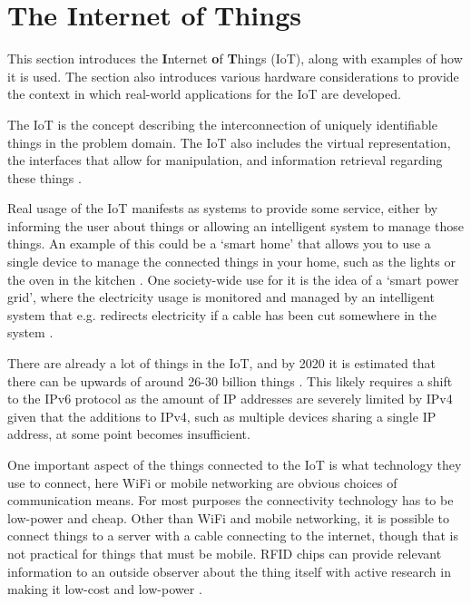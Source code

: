\section{The Internet of Things}
This section introduces the \textbf{I}nternet \textbf{o}f \textbf{T}hings (IoT), along with examples of how it is used. 
The section also introduces various hardware considerations to provide the context in which real-world applications for the IoT are developed.

The IoT is the concept describing the interconnection of uniquely identifiable things in the problem domain.
The IoT also includes the virtual representation, the interfaces that allow for manipulation, and information retrieval regarding these things \citep{misc:InternetOfThingsDefinition, misc:InternetOfThingsDefinition2, misc:InternetOfThingsDefinition3}.

Real usage of the IoT manifests as systems to provide some service, either by informing the user about things or allowing an intelligent system to manage those things.
An example of this could be a `smart home' that allows you to use a single device to manage the connected things in your home, such as the lights or the oven in the kitchen \citep{misc:InternetOfThingsExamples}.
One society-wide use for it is the idea of a `smart power grid', where the electricity usage is monitored and managed by an intelligent system that e.g. redirects electricity if a cable has been cut somewhere in the system \citep{misc:smartGrid}.

There are already a lot of things in the IoT, and by 2020 it is estimated that there can be upwards of around 26-30 billion things \citep{misc:IoTGrowth1,misc:IoTGrowth2}.
This likely requires a shift to the IPv6 protocol as the amount of IP addresses are severely limited by IPv4 \citep{misc:numberOfAddresses} given that the additions to IPv4, such as multiple devices sharing a single IP address, at some point becomes insufficient.

One important aspect of the things connected to the IoT is what technology they use to connect, here WiFi or mobile networking are obvious choices of communication means.
For most purposes the connectivity technology has to be low-power and cheap.
Other than WiFi and mobile networking, it is possible to connect things to a server with a cable connecting to the internet, though that is not practical for things that must be mobile.
RFID chips can provide relevant information to an outside observer about the thing itself \citep{misc:rfid} with active research in making it low-cost and low-power \citep{misc:rfid2}.

